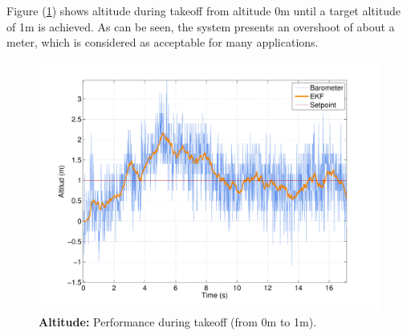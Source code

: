 \documentclass[conference]{IEEEtran}
\newcommand{\refp}[1]{(\ref{#1})}
\begin{document}




Figure \refp{fig:altura.pdf} shows altitude during takeoff from altitude 0m until a target altitude of 1m is achieved. As can be seen, the system presents an overshoot of about a meter, which is considered as acceptable for many applications. 


\begin{figure}[h!]
	\centering
	\includegraphics[width=.7\columnwidth]{./pics_paper/altura.pdf}
	\caption{\textbf{Altitude:} Performance during takeoff (from 0m to 1m).}
	\label{fig:altura.pdf}
\end{figure}

\end{document}
